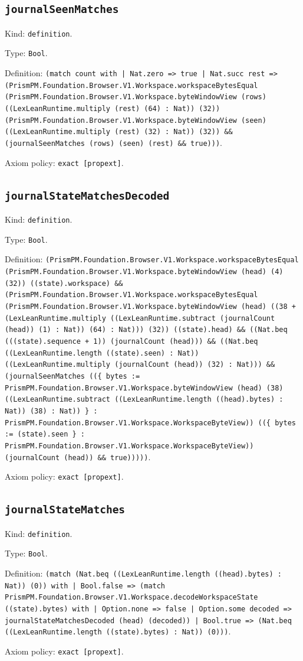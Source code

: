 \documentclass[11pt]{article}
\begin{document}
\subsection*{\texttt{journalSeenMatches}}
\noindent Kind: \texttt{definition}.\par
\noindent Type: \texttt{Bool}.\par
\noindent Definition: \texttt{(match count with | Nat.zero => true | Nat.succ rest => (PrismPM.Foundation.Browser.V1.Workspace.workspaceBytesEqual (PrismPM.Foundation.Browser.V1.Workspace.byteWindowView (rows) ((LexLeanRuntime.multiply (rest) (64) : Nat)) (32)) (PrismPM.Foundation.Browser.V1.Workspace.byteWindowView (seen) ((LexLeanRuntime.multiply (rest) (32) : Nat)) (32)) \&\& (journalSeenMatches (rows) (seen) (rest) \&\& true)))}.\par
\noindent Axiom policy: \texttt{exact [propext]}.\par
\subsection*{\texttt{journalStateMatchesDecoded}}
\noindent Kind: \texttt{definition}.\par
\noindent Type: \texttt{Bool}.\par
\noindent Definition: \texttt{(PrismPM.Foundation.Browser.V1.Workspace.workspaceBytesEqual (PrismPM.Foundation.Browser.V1.Workspace.byteWindowView (head) (4) (32)) ((state).workspace) \&\& (PrismPM.Foundation.Browser.V1.Workspace.workspaceBytesEqual (PrismPM.Foundation.Browser.V1.Workspace.byteWindowView (head) ((38 + (LexLeanRuntime.multiply ((LexLeanRuntime.subtract (journalCount (head)) (1) : Nat)) (64) : Nat))) (32)) ((state).head) \&\& ((Nat.beq (((state).sequence + 1)) (journalCount (head))) \&\& ((Nat.beq ((LexLeanRuntime.length ((state).seen) : Nat)) ((LexLeanRuntime.multiply (journalCount (head)) (32) : Nat))) \&\& (journalSeenMatches ((\{ bytes := PrismPM.Foundation.Browser.V1.Workspace.byteWindowView (head) (38) ((LexLeanRuntime.subtract ((LexLeanRuntime.length ((head).bytes) : Nat)) (38) : Nat)) \} : PrismPM.Foundation.Browser.V1.Workspace.WorkspaceByteView)) ((\{ bytes := (state).seen \} : PrismPM.Foundation.Browser.V1.Workspace.WorkspaceByteView)) (journalCount (head)) \&\& true)))))}.\par
\noindent Axiom policy: \texttt{exact [propext]}.\par
\subsection*{\texttt{journalStateMatches}}
\noindent Kind: \texttt{definition}.\par
\noindent Type: \texttt{Bool}.\par
\noindent Definition: \texttt{(match (Nat.beq ((LexLeanRuntime.length ((head).bytes) : Nat)) (0)) with | Bool.false => (match PrismPM.Foundation.Browser.V1.Workspace.decodeWorkspaceState ((state).bytes) with | Option.none => false | Option.some decoded => journalStateMatchesDecoded (head) (decoded)) | Bool.true => (Nat.beq ((LexLeanRuntime.length ((state).bytes) : Nat)) (0)))}.\par
\noindent Axiom policy: \texttt{exact [propext]}.\par
\end{document}
